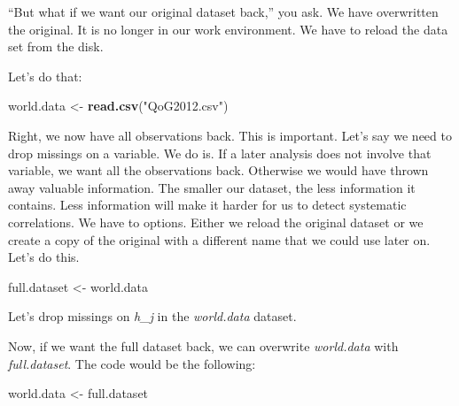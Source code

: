 \documentclass[]{book}
\newenvironment{Shaded}{\begin{snugshade}}{\end{snugshade}}
\newcommand{\KeywordTok}[1]{\textcolor[rgb]{0.13,0.29,0.53}{\textbf{#1}}}
\newcommand{\StringTok}[1]{\textcolor[rgb]{0.31,0.60,0.02}{#1}}
\newcommand{\OperatorTok}[1]{\textcolor[rgb]{0.81,0.36,0.00}{\textbf{#1}}}
\newcommand{\NormalTok}[1]{#1}
\theoremstyle{definition}
\theoremstyle{definition}
\theoremstyle{definition}
\theoremstyle{remark}
\begin{document}
``But what if we want our original dataset back,'' you ask. We have
overwritten the original. It is no longer in our work environment. We
have to reload the data set from the disk.

Let's do that:

\begin{Shaded}
\begin{Highlighting}[]
\NormalTok{world.data <-}\StringTok{ }\KeywordTok{read.csv}\NormalTok{(}\StringTok{"QoG2012.csv"}\NormalTok{)}
\end{Highlighting}
\end{Shaded}

Right, we now have all observations back. This is important. Let's say
we need to drop missings on a variable. We do is. If a later analysis
does not involve that variable, we want all the observations back.
Otherwise we would have thrown away valuable information. The smaller
our dataset, the less information it contains. Less information will
make it harder for us to detect systematic correlations. We have to
options. Either we reload the original dataset or we create a copy of
the original with a different name that we could use later on. Let's do
this.

\begin{Shaded}
\begin{Highlighting}[]
\NormalTok{full.dataset <-}\StringTok{ }\NormalTok{world.data}
\end{Highlighting}
\end{Shaded}

Let's drop missings on \emph{h\_j} in the \emph{world.data} dataset.

\begin{Shaded}
\end{Shaded}

Now, if we want the full dataset back, we can overwrite
\emph{world.data} with \emph{full.dataset}. The code would be the
following:

\begin{Shaded}
\begin{Highlighting}[]
\NormalTok{world.data <-}\StringTok{ }\NormalTok{full.dataset}
\end{Highlighting}
\end{Shaded}
\end{document}
